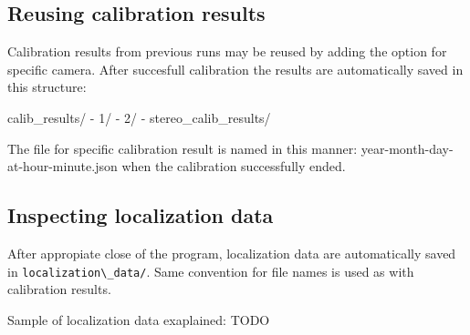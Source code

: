 \subsection{Reusing calibration results}
Calibration results from previous runs may be reused by adding the option for specific camera. After succesfull calibration the results are automatically saved in this structure:

\begin{code}
calib\_results/
 - 1/
 - 2/
 - stereo\_calib\_results/
\end{code} 	

The file for specific calibration result is named in this manner:
{year}-{month}-{day}-at-{hour}-{minute}.json when the calibration successfully
ended.

\subsection {Inspecting localization data}
After appropiate close of the program, localization data are automatically
saved in \verb+localization\_data/+. Same convention for file names is used as
with calibration results.

Sample of localization data exaplained:
TODO
